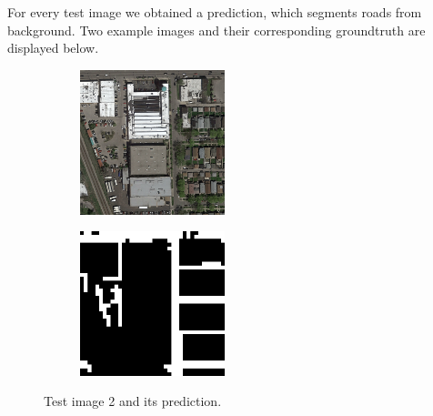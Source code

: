 \documentclass[10pt,conference,compsocconf]{IEEEtran}
\begin{document}
For every test image we obtained a prediction, which segments roads from background. Two example images and their corresponding groundtruth are displayed below.

\begin{figure}[H]
	\centering
	\begin{subfigure}[htb]{0.2\textwidth}
		\includegraphics[width=4.2cm]{images/visualize_pred/images/test_2.png}
		\label{fig:test2}
	\end{subfigure}
	\hspace{1.5em}
	\begin{subfigure}[htb]{0.2\textwidth}
		\includegraphics[width=4.2cm]{images/visualize_pred/groundtruth/pred_2.png}
		\label{fig:pred2}
	\end{subfigure}
	\caption{Test image 2 and its prediction.}
\end{figure}
\end{document}
